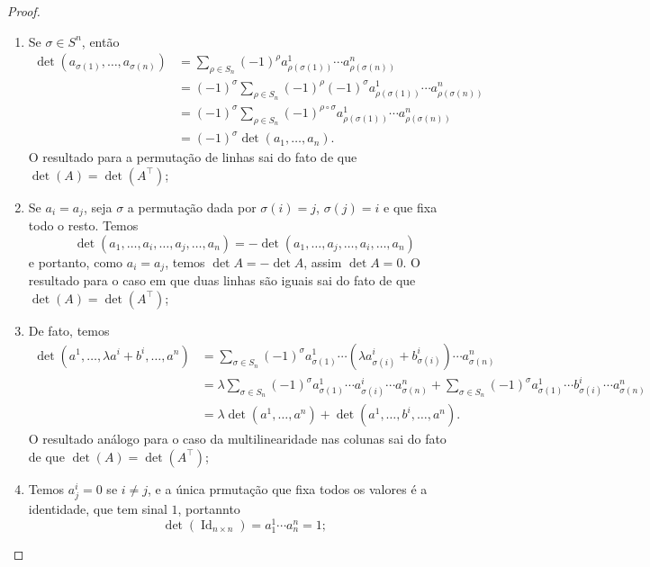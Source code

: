 \documentclass{article}
\DeclareMathOperator{\Id}{Id}
\begin{document}
\begin{proof}
    \begin{enumerate}
        \item Se $\sigma \in S^n$, então \begin{align}
            \det(a_{\sigma(1)}, \dots, a_{\sigma(n)}) &= \sum_{\rho \in S_n} (-1)^\rho a^1_{\rho(\sigma(1))} \cdots a^n_{\rho(\sigma(n))} \\ &= (-1)^\sigma \sum_{\rho \in S_n} (-1)^\rho (-1)^\sigma a^1_{\rho(\sigma(1))} \cdots a^n_{\rho(\sigma(n))} \\ &= (-1)^\sigma \sum_{\rho \in S_n} (-1)^{\rho \circ \sigma} a^1_{\rho(\sigma(1))} \cdots a^n_{\rho(\sigma(n))} \\ &= (-1)^{\sigma} \det(a_1, \dots, a_n).
        \end{align} O resultado para a permutação de linhas sai do fato de que $\det(A) = \det(A^\top)$;

        \item Se $a_i = a_j$, seja $\sigma$ a permutação dada por $\sigma(i) = j$, $\sigma(j) = i$ e que fixa todo o resto. Temos \begin{equation}
            \det(a_1, \dots, a_i, \dots, a_j, \dots, a_n) = -\det(a_1, \dots, a_j, \dots, a_i, \dots, a_n)
        \end{equation} e portanto, como $a_i = a_j$, temos $\det A = -\det A$, assim $\det A = 0$. O resultado para o caso em que duas linhas são iguais sai do fato de que $\det(A) = \det(A^\top)$;

        \item De fato, temos \begin{align}
            \det(a^1, \dots, \lambda a^i + b^i, \dots, a^n) &= \sum_{\sigma \in S_n} (-1)^\sigma a^1_{\sigma(1)} \cdots (\lambda a^i_{\sigma(i)} + b^i_{\sigma(i)}) \cdots a^n_{\sigma(n)} \\ &= \lambda \sum_{\sigma \in S_n} (-1)^\sigma a^1_{\sigma(1)} \cdots a^i_{\sigma(i)} \cdots a^n_{\sigma(n)} + \sum_{\sigma \in S_n} (-1)^\sigma a^1_{\sigma(1)} \cdots b^i_{\sigma(i)} \cdots a^n_{\sigma(n)} \\ &= \lambda \det(a^1, \dots, a^n) + \det(a^1, \dots, b^i, \dots, a^n).
        \end{align} O resultado análogo para o caso da multilinearidade nas colunas sai do fato de que $\det(A) = \det(A^\top)$;

        \item Temos $a^i_j = 0$ se $i \neq j$, e a única prmutação que fixa todos os valores é a identidade, que tem sinal $1$, portannto \begin{equation}
            \det(\Id_{n \times n}) = a^1_1 \cdots a^n_n = 1;
        \end{equation}


\end{enumerate}
\end{proof}
\end{document}

